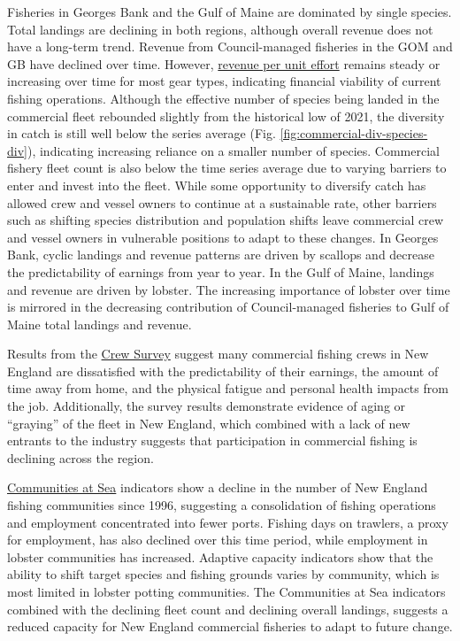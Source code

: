 \documentclass[
  10pt,
]{article}
\begin{document}
Fisheries in Georges Bank and the Gulf of Maine are dominated by single species. Total landings are declining in both regions, although overall revenue does not have a long-term trend. Revenue from Council-managed fisheries in the GOM and GB have declined over time. However, \href{https://noaa-edab.github.io/catalog/effective_sweptarea.html}{revenue per unit effort} remains steady or increasing over time for most gear types, indicating financial viability of current fishing operations. Although the effective number of species being landed in the commercial fleet rebounded slightly from the historical low of 2021, the diversity in catch is still well below the series average (Fig. \ref{fig:commercial-div-species-div}), indicating increasing reliance on a smaller number of species. Commercial fishery fleet count is also below the time series average due to varying barriers to enter and invest into the fleet. While some opportunity to diversify catch has allowed crew and vessel owners to continue at a sustainable rate, other barriers such as shifting species distribution and population shifts leave commercial crew and vessel owners in vulnerable positions to adapt to these changes. In Georges Bank, cyclic landings and revenue patterns are driven by scallops and decrease the predictability of earnings from year to year. In the Gulf of Maine, landings and revenue are driven by lobster. The increasing importance of lobster over time is mirrored in the decreasing contribution of Council-managed fisheries to Gulf of Maine total landings and revenue.

Results from the \href{https://noaa-edab.github.io/catalog/crew_survey.html}{Crew Survey} suggest many commercial fishing crews in New England are dissatisfied with the predictability of their earnings, the amount of time away from home, and the physical fatigue and personal health impacts from the job. Additionally, the survey results demonstrate evidence of aging or ``graying'' of the fleet in New England, which combined with a lack of new entrants to the industry suggests that participation in commercial fishing is declining across the region.

\href{https://noaa-edab.github.io/catalog/communities_at_sea.html}{Communities at Sea} indicators show a decline in the number of New England fishing communities since 1996, suggesting a consolidation of fishing operations and employment concentrated into fewer ports. Fishing days on trawlers, a proxy for employment, has also declined over this time period, while employment in lobster communities has increased. Adaptive capacity indicators show that the ability to shift target species and fishing grounds varies by community, which is most limited in lobster potting communities. The Communities at Sea indicators combined with the declining fleet count and declining overall landings, suggests a reduced capacity for New England commercial fisheries to adapt to future change.
\end{document}
